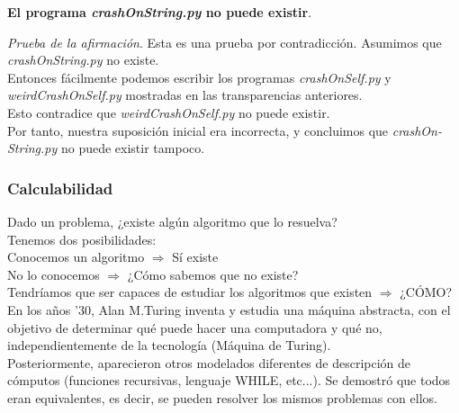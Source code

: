 \documentclass[xcolor=table]{beamer}
\begin{document}
\begin{frame}  [fragile] \normalsize 

\textbf{El programa\textit{ crashOnString.py} no puede existir}. \\\newline


\textit{Prueba de la afirmación}. Esta es una prueba por contradicción. Asumimos que \textit{crashOnString.py} no existe. \\

Entonces fácilmente podemos escribir los programas \textit{crashOnSelf.py}
y \textit{weirdCrashOnSelf.py} mostradas en las transparencias anteriores.\\ 

Esto contradice que \textit{weirdCrashOnSelf.py} no puede existir. \\


Por tanto, nuestra suposición inicial era incorrecta, y concluimos que \textit{crashOn-String.py} no puede existir tampoco.

\end{frame} 





\begin{frame}  \frametitle{Calculabilidad}\small

Dado un problema, ¿existe algún algoritmo que lo resuelva?\\

Tenemos dos posibilidades:\\
Conocemos un algoritmo $ \Rightarrow$ Sí existe\\
No lo conocemos $ \Rightarrow$ ¿Cómo sabemos que no existe?\\

Tendríamos que ser capaces de estudiar los algoritmos que existen $ \Rightarrow$ ¿CÓMO?\\

En los años '30, Alan M.Turing inventa y estudia una máquina abstracta, con el objetivo de determinar qué puede hacer una computadora y qué no, independientemente de la tecnología (Máquina de Turing).\\

Posteriormente, aparecieron otros modelados diferentes de descripción de cómputos (funciones recursivas, lenguaje WHILE, etc...). Se demostró que todos eran equivalentes, es decir, se pueden resolver los mismos problemas con ellos.
\end{frame}
\end{document}
